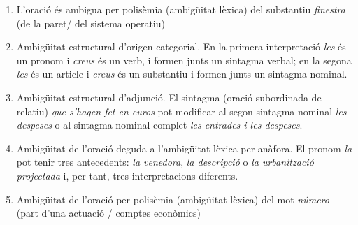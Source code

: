 \begin{enumerate}
\begin{enumerate}
  \item L'oració és ambigua per polisèmia (ambigüitat lèxica) del
    substantiu \emph{finestra} (de la paret/ del sistema operatiu)
   \item Ambigüitat estructural d'origen categorial. En la primera
     interpretació \emph{les} és un pronom i \emph{creus} és un verb,
     i formen junts un sintagma verbal; en la segona \emph{les} és un
     article i \emph{creus} és un substantiu i formen junts un
     sintagma nominal.
   \item Ambigüitat estructural d'adjunció. El sintagma (oració
     subordinada de relatiu) \emph{que s'hagen fet en euros} pot
     modificar al segon sintagma nominal \emph{les despeses} o al
     sintagma nominal complet \emph{les entrades i les despeses}.
   \item Ambigüitat de l'oració deguda a l'ambigüitat lèxica per
     anàfora.  El pronom \emph{la} pot tenir tres antecedents:
     \emph{la venedora}, \emph{la descripció} o \emph{la urbanització
       projectada} i, per tant, tres interpretacions diferents.
\item Ambigüitat de l'oració per polisèmia (ambigüitat lèxica) del mot
  \emph{número} (part d'una actuació / comptes econòmics)

\end{enumerate}
\end{enumerate}
